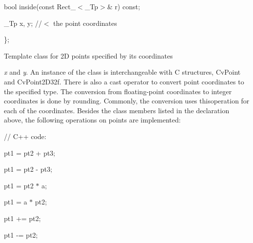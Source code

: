 {\ttfamily }

{\ttfamily }

{\ttfamily bool inside(const Rect\+\_\+$<$\+\_\+\+Tp$>$\& r) const;}

{\ttfamily }

{\ttfamily }

{\ttfamily \+\_\+\+Tp x, y; //$<$ the point coordinates}

{\ttfamily }

{\ttfamily }

{\ttfamily \};}

{\ttfamily }

{\ttfamily }

{\ttfamily Template class for 2D points specified by its coordinates }

{\itshape x} and {\itshape y}. An instance of the class is interchangeable with C structures, {\ttfamily Cv\+Point} and {\ttfamily Cv\+Point2\+D32f}. There is also a cast operator to convert point coordinates to the specified type. The conversion from floating-\/point coordinates to integer coordinates is done by rounding. Commonly, the conversion uses thisoperation for each of the coordinates. Besides the class members listed in the declaration above, the following operations on points are implemented\+: {\ttfamily }

{\ttfamily }

{\ttfamily }

{\ttfamily // C++ code\+:}

{\ttfamily }

{\ttfamily }

{\ttfamily pt1 = pt2 + pt3;}

{\ttfamily }

{\ttfamily }

{\ttfamily pt1 = pt2 -\/ pt3;}

{\ttfamily }

{\ttfamily }

{\ttfamily pt1 = pt2 $\ast$ a;}

{\ttfamily }

{\ttfamily }

{\ttfamily pt1 = a $\ast$ pt2;}

{\ttfamily }

{\ttfamily }

{\ttfamily pt1 += pt2;}

{\ttfamily }

{\ttfamily }

{\ttfamily pt1 -\/= pt2;}

